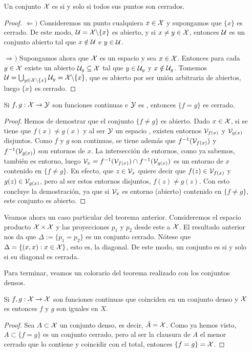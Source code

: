 \begin{prop}
	Un conjunto $\mathcal{X}$ es \frechet si y solo si todos sus puntos son cerrados.
	\begin{proof}
		$\Leftarrow)$ Consideremos un punto cualquiera $x\in \mathcal{X}$ y supongamos que $\{x\}$ es cerrado. De este modo, $\mathcal{U}=\mathcal{X}\backslash \{x\}$ es abierto, y si $x\neq y\in \mathcal{X}$, entonces $\mathcal{U}$ es un conjunto abierto tal que $x\notin \mathcal{U}$ e $y\in \mathcal{U}$.
		 
		$\Rightarrow)$ Supongamos ahora que $\mathcal{X}$ es un espacio \frechet y sea $x\in \mathcal{X}$. Entonces para cada $y\in \mathcal{X}$ existe un abierto $\mathcal{U}_y \subseteq \mathcal{X}$ tal que $y\in \mathcal{U}_y$ y $x\notin \mathcal{U}_y$. Tomemos $\mathcal{U}=\bigcup_{y\in \mathcal{X}\backslash\{x\}}\mathcal{U}_y=\mathcal{X}\backslash\{x\}$, que es abierto por ser unión arbitraria de abiertos, luego $\{x\}$ es cerrado. 
	\end{proof}
\end{prop}

\begin{theo}
	Si $f,g:\mathcal{X}\to \mathcal{Y}$ son funciones continuas e $\mathcal{Y}$ es \hausdorff, entonces $\{f=g\}$ es cerrado. 
	\begin{proof}
		Hemos de demostrar que el conjunto $\{f\neq g\}$ es abierto. Dado $x\in \mathcal{X}$, si se tiene que $f(x)\neq g(x)$ y al ser $\mathcal{Y}$ un espacio \hausdorff, existen entornos $\mathcal{V}_{f(x)}$ y $\mathcal{V}_{g(x)}$ disjuntos. Como $f$ y $g$ son continuas, se tiene además que $f^{-1}(\mathcal{V}_{f(x)})$ y $f^{-1}(\mathcal{V}_{g(x)})$ son entornos de $x$. La intersección de entornos, como ya sabemos, también es entorno, luego $\mathcal{V}_x=f^{-1}(\mathcal{V}_{f(x)})\cap f^{-1}(\mathcal{V}_{g(x)})$ es un entorno de $x$ contenido en $\{f\neq g\}$. En efecto, que $z\in \mathcal{V}_x$ quiere decir que $f(z)\in \mathcal{V}_{f(x)}$ y $g(z)\in \mathcal{V}_{g(x)}$, pero al ser estos entornos disjuntos, $f(z)\neq g(z)$. Con esto concluye la demostración, ya que si $\mathcal{V}_x$ es entorno (abierto) contenido en $\{f\neq g\}$, este conjunto es abierto.
	\end{proof}
\end{theo}

Veamos ahora un caso particular del teorema anterior. Consideremos el espacio producto $\mathcal{X}\times \mathcal{X}$ y las proyecciones $p_1$ y $p_2$ desde este a $\mathcal{X}$. El resultado anterior nos da que $\Delta:=\{p_1=p_2\}$ es un conjunto cerrado. Nótese que $\Delta=\{(x,x):x\in \mathcal{X}\}$, esto es, la diagonal. De este modo, un conjunto es \hausdorff si y solo si su diagonal es cerrada.

Para terminar, veamos un colorario del teorema realizado con los conjuntos densos.  

\begin{cor}
	Si $f,g:\mathcal{X}\to \mathcal{X}$ son funciones continuas que coinciden en un conjunto denso y $\mathcal{X}$ es \hausdorff entonces $f$ y $g$ son iguales en $X$. 
	\begin{proof}
		Sea $A\subset \mathcal{X}$ un conjunto denso, es decir, $\bar{A}=\mathcal{X}$. Como ya hemos visto, $A\subset \{f=g\}$ es un conjunto cerrado, pero al ser la clausura de $A$ el menor cerrado que lo contiene y coincidir con el total, entonces $\{f=g\}=\mathcal{X}$.
	\end{proof}
\end{cor}

